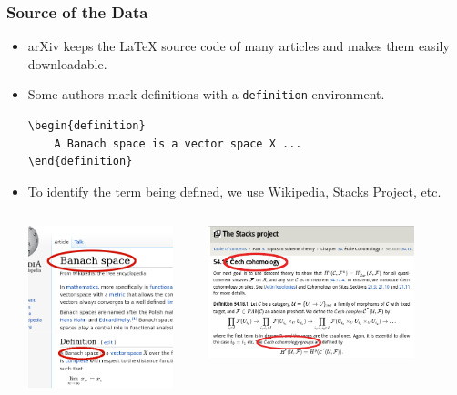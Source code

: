 \documentclass[10pt, handout]{beamer}
\begin{document}
\begin{frame}[fragile]
    \frametitle{Source of the Data}
    \begin{itemize}
        \item arXiv keeps the \LaTeX{} source code of many articles and makes them easily downloadable.
            \pause
        \item Some authors mark definitions with a \texttt{definition} environment.
            \begin{verbatim}
\begin{definition}
    A Banach space is a vector space X ...
\end{definition}
    \end{verbatim}
    \pause
\item To identify the term being defined, we use Wikipedia, Stacks Project, etc.
    \begin{columns}
        \begin{column}{0.4\textwidth}
            \includegraphics[width=0.9\textwidth]{../Images/wiki_thin_banach.png}
        \end{column}
        \pause
        \begin{column}{0.6\textwidth}
            \includegraphics[width=0.8\textwidth]{../Images/stacks_defs.png}

\end{column}
\end{columns}
\end{itemize}
\end{frame}
\end{document}
